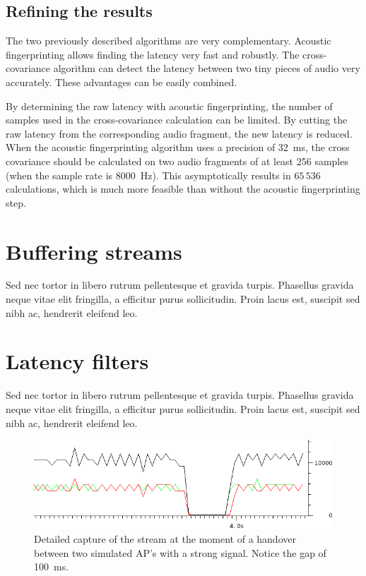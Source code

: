 \documentclass[twocolumn]{phdsymp} %
\begin{document}
\subsection{Refining the results}

The two previously described algorithms are very complementary. Acoustic fingerprinting allows finding the latency very fast and robustly. The cross-covariance algorithm can detect the latency between two tiny pieces of audio very accurately. These advantages can be easily combined.

By determining the raw latency with acoustic fingerprinting, the number of samples used in the cross-covariance calculation can be limited. By cutting the raw latency from the corresponding audio fragment, the new latency is reduced. When the acoustic fingerprinting algorithm uses a precision of 32~ms, the cross covariance should be calculated on two audio fragments of at least 256 samples (when the sample rate is 8000~Hz). This asymptotically results in $65\,536$ calculations, which is much more feasible than without the acoustic fingerprinting step.

\section{Buffering streams}
Sed nec tortor in libero rutrum pellentesque\cite{six2014tarsosdsp} et gravida turpis. Phasellus gravida neque vitae elit fringilla, a efficitur purus sollicitudin. Proin lacus est, suscipit sed nibh ac, hendrerit eleifend leo.

\section{Latency filters}
Sed nec tortor in libero rutrum pellentesque\cite{six2014tarsosdsp} et gravida turpis. Phasellus gravida neque vitae elit fringilla, a efficitur purus sollicitudin. Proin lacus est, suscipit sed nibh ac, hendrerit eleifend leo.

\begin{figure}[ht]
	\begin{center}
		\includegraphics[width=.40\textwidth]{referentie-detail}
		\caption{\label{2AP}Detailed capture of the stream at the moment of a handover between two simulated AP's with a strong signal.  Notice the gap of 100~ms.}
	\end{center}
\end{figure}
\end{document}
